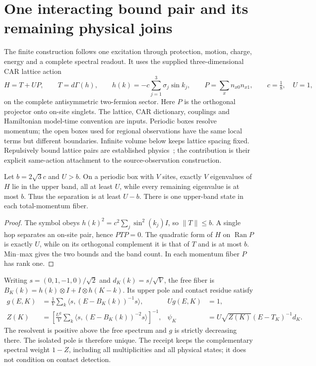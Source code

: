 \section{One interacting bound pair and its remaining physical joins}
\label{sec:weyl-contact-pair}

The finite construction follows one excitation through protection,
motion, charge, energy and a complete spectral readout. It uses the supplied
three-dimensional CAR lattice action
\[
 H=T+UP,\qquad T=d\Gamma(h),\qquad
 h(k)=-c\sum_{j=1}^3\sigma_j\sin k_j,\qquad
 P=\sum_x n_{x0}n_{x1},\qquad c=\tfrac18,\quad U=1,
\]
on the complete antisymmetric two-fermion sector. Here $P$ is the
orthogonal projector onto on-site singlets. The lattice, CAR dictionary,
couplings and Hamiltonian model-time convention are inputs. Periodic boxes
resolve momentum; the open boxes used for regional observations have the
same local terms but different boundaries. Infinite volume below keeps
lattice spacing fixed. Repulsively bound lattice pairs are established
physics~\cite{pwwinkler2006repulsively}; the contribution is their explicit
same-action attachment to the source-observation construction.

\begin{proposition}
Let $b=2\sqrt3c$ and $U>b$. On a periodic box with $V$ sites, exactly $V$
eigenvalues of $H$ lie in the upper band, all at least $U$, while every
remaining eigenvalue is at most $b$. Thus the separation is at least $U-b$.
There is one upper-band state in each total-momentum fiber.
\end{proposition}
\begin{proof}
The symbol obeys $h(k)^2=c^2\sum_j\sin^2(k_j)I$, so $\|T\|\le b$.
A single hop separates an on-site pair, hence $PTP=0$. The quadratic form
of $H$ on $\operatorname{Ran}P$ is exactly $U$, while on its orthogonal
complement it is that of $T$ and is at most $b$. Min--max gives the two
bounds and the band count. In each momentum fiber $P$ has rank one.
\end{proof}

Writing $s=(0,1,-1,0)/\sqrt2$ and $d_K(k)=s/\sqrt V$, the free fiber is
$B_K(k)=h(k)\otimes I+I\otimes h(K-k)$. Its upper pole and contact
residue satisfy
\begin{align*}
 g(E,K)&=\frac1V\sum_k\langle s,(E-B_K(k))^{-1}s\rangle,
 &Ug(E,K)&=1,\\
 Z(K)&=\left[\frac{U^2}{V}\sum_k
       \langle s,(E-B_K(k))^{-2}s\rangle\right]^{-1},
 &\psi_K&=U\sqrt{Z(K)}(E-T_K)^{-1}d_K.
\end{align*}
The resolvent is positive above the free spectrum and $g$ is strictly
decreasing there. The isolated pole is therefore unique. The receipt keeps
the complementary spectral weight $1-Z$, including all multiplicities and
all physical states; it does not condition on contact detection.

